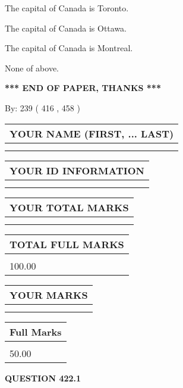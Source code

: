 \documentclass[12pt]{article}
\begin{document}
  
 
 
The capital of Canada is Toronto.
 
 
The capital of Canada is Ottawa.
 
 
The capital of Canada is Montreal.
 
 
 None of above.
 
 
   
   
\vspace{1.0in} 
{\textbf{\large{ *** END OF PAPER, THANKS *** }}} 
   
   
\hspace{1.0in} By: 
 239 ( 416 ,  458 )
   
   
   
   
\newpage 
\setcounter{page}{ 
   422001 } 
   
   
   
   
\noindent\begin{tabular}{|l|}
\hline
YOUR NAME (FIRST, ... LAST)  \\
\hline
 \\ 
 \\ 
\hline
\end{tabular}
\hspace{0.05in} \begin{tabular}{|l|}
\hline
 YOUR   ID   INFORMATION  \\
\hline
 \\ 
 \\ 
\hline
\end{tabular}
   
   
\vspace{0.2in}\noindent\begin{tabular}{|l|}
\hline
YOUR TOTAL MARKS  \\
\hline
 \\ 
 \\ 
\hline
\end{tabular}
\hspace{0.05in} \begin{tabular}{|l|}
\hline
TOTAL FULL MARKS  \\
\hline
 \\ 
100.00 \\
\hline
\end{tabular}
  
\vspace{0.2in}
  
\noindent\begin{tabular}{|l|}
\hline
 YOUR MARKS  \\
\hline
 \\ 
 \\ 
\hline
\end{tabular}
\hspace{0.05in} \begin{tabular}{|l|}
\hline
 Full Marks  \\
\hline
 \\ 
50.00 \\
\hline
\end{tabular}
{\textbf{\Large{QUESTION
422.1 
}}}
  
\end{document}
